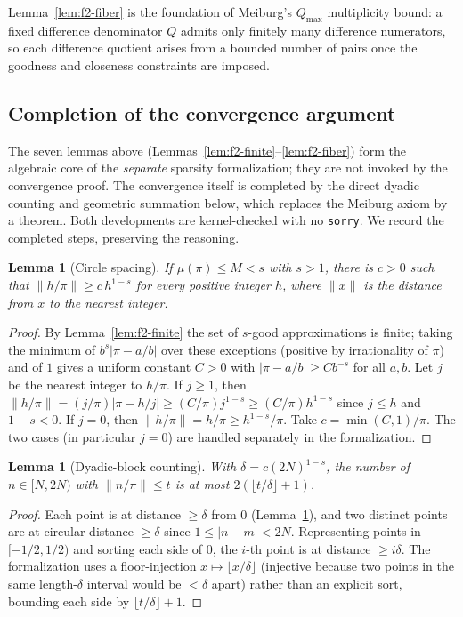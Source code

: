 \documentclass[11pt]{amsart}
\newtheorem{lemma}[theorem]{Lemma}
\theoremstyle{definition}
\theoremstyle{remark}
\numberwithin{equation}{section}
\newcommand{\irr}{\mu}
\begin{document}
Lemma~\ref{lem:f2-fiber} is the foundation of Meiburg's $Q_{\max}$ multiplicity bound: a fixed difference denominator $Q$ admits only finitely many difference numerators, so each difference quotient arises from a bounded number of pairs once the goodness and closeness constraints are imposed.

\subsection{Completion of the convergence argument}\label{sec:lean-f2-remaining}

The seven lemmas above (Lemmas~\ref{lem:f2-finite}--\ref{lem:f2-fiber}) form the algebraic core of the \emph{separate} sparsity formalization; they are not invoked by the convergence proof. The convergence itself is completed by the direct dyadic counting and geometric summation below, which replaces the Meiburg axiom by a theorem. Both developments are kernel-checked with no \texttt{sorry}. We record the completed steps, preserving the reasoning.

\begin{lemma}[Circle spacing]\label{lem:f2-spacing}
If $\irr(\pi)\le M<s$ with $s>1$, there is $c>0$ such that $\|h/\pi\|\ge c\,h^{1-s}$ for every positive integer $h$, where $\|x\|$ is the distance from $x$ to the nearest integer.
\end{lemma}
\begin{proof}
By Lemma~\ref{lem:f2-finite} the set of $s$-good approximations is finite; taking the minimum of $b^s|\pi-a/b|$ over these exceptions (positive by irrationality of $\pi$) and of $1$ gives a uniform constant $C>0$ with $|\pi-a/b|\ge C b^{-s}$ for all $a,b$. Let $j$ be the nearest integer to $h/\pi$. If $j\ge1$, then $\|h/\pi\|=(j/\pi)|\pi-h/j|\ge(C/\pi)j^{1-s}\ge(C/\pi)h^{1-s}$ since $j\le h$ and $1-s<0$. If $j=0$, then $\|h/\pi\|=h/\pi\ge h^{1-s}/\pi$. Take $c=\min(C,1)/\pi$. The two cases (in particular $j=0$) are handled separately in the formalization.
\end{proof}

\begin{lemma}[Dyadic-block counting]\label{lem:f2-count}
With $\delta=c(2N)^{1-s}$, the number of $n\in[N,2N)$ with $\|n/\pi\|\le t$ is at most $2(\lfloor t/\delta\rfloor+1)$.
\end{lemma}
\begin{proof}
Each point is at distance $\ge\delta$ from $0$ (Lemma~\ref{lem:f2-spacing}), and two distinct points are at circular distance $\ge\delta$ since $1\le|n-m|<2N$. Representing points in $[-1/2,1/2)$ and sorting each side of $0$, the $i$-th point is at distance $\ge i\delta$. The formalization uses a floor-injection $x\mapsto\lfloor x/\delta\rfloor$ (injective because two points in the same length-$\delta$ interval would be $<\delta$ apart) rather than an explicit sort, bounding each side by $\lfloor t/\delta\rfloor+1$.
\end{proof}
\end{document}
